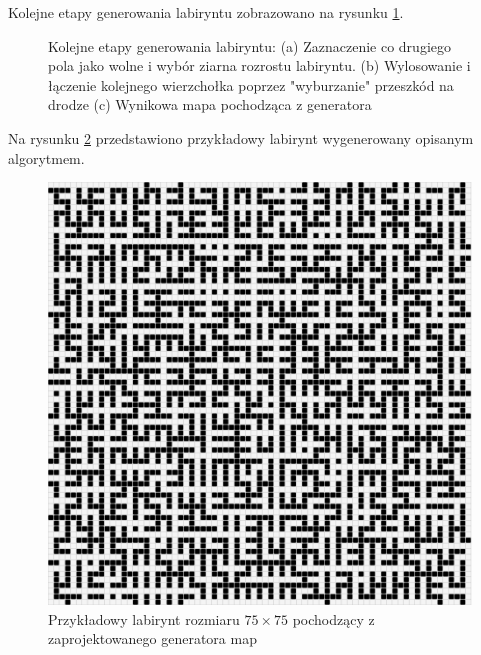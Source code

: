 Kolejne etapy generowania labiryntu zobrazowano na rysunku \ref{fig:etapy-generowania}.

\begin{figure}
    \centering
        \qquad
        \qquad
    \caption{Kolejne etapy generowania labiryntu:
    (a) Zaznaczenie co drugiego pola jako wolne i wybór ziarna rozrostu labiryntu.
    (b) Wylosowanie i łączenie kolejnego wierzchołka poprzez "wyburzanie" przeszkód na drodze
    (c) Wynikowa mapa pochodząca z generatora}
    \label{fig:etapy-generowania}
\end{figure}

Na rysunku \ref{fig:maze75-75} przedstawiono przykładowy labirynt wygenerowany opisanym algorytmem.
\begin{figure}
	\centering
	\includegraphics[width=0.6\columnwidth]{img/mazegen/maze-75-75}
	\caption{Przykładowy labirynt rozmiaru $75 \times 75$ pochodzący z zaprojektowanego generatora map}
	\label{fig:maze75-75}
\end{figure}

